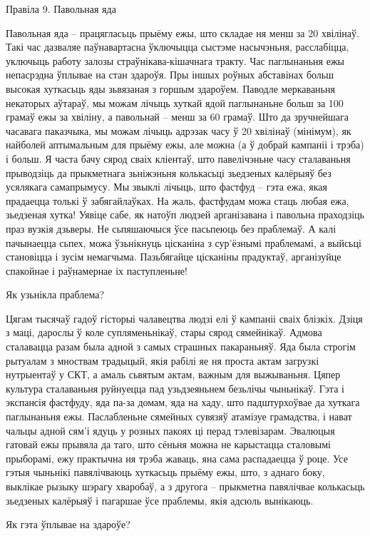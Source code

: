 Правіла 9. Павольная яда

Павольная яда – працягласьць прыёму ежы, што складае ня менш за 20 хвілінаў. Такі час дазваляе паўнавартасна ўключыцца сыстэме насычэньня, расслабіцца, уключыць работу залозы страўнікава-кішачнага тракту. Час паглынаньня ежы непасрэдна ўплывае на стан здароўя. Пры іншых роўных абставінах больш высокая хуткасьць яды зьвязаная з горшым здароўем. Паводле меркаваньня некаторых аўтараў, мы можам лічыць хуткай ядой паглынаньне больш за 100 грамаў ежы за хвіліну, а павольнай – менш за 60 грамаў. Што да зручнейшага часавага паказчыка, мы можам лічыць адрэзак часу ў 20 хвілінаў (мінімум), як найболей аптымальным для прыёму ежы, але можна (а ў добрай кампаніі і трэба) і больш.
Я часта бачу сярод сваіх кліентаў, што павелічэньне часу сталаваньня прыводзіць да прыкметнага зьніжэньня колькасьці зьедзеных калёрыяў без усялякага самапрымусу. Мы звыклі лічыць, што фастфуд – гэта ежа, якая прадаецца толькі ў забягайлаўках. На жаль, фастфудам можа стаць любая ежа, зьедзеная хутка! Уявіце сабе, як натоўп людзей арганізавана і павольна праходзіць праз вузкія дзьверы. Не сьпяшаючыся ўсе пасьпеюць без праблемаў. А калі пачынаецца сьпех, можа ўзьнікнуць цісканіна з сур'ёзнымі праблемамі, а выйсьці становіцца і зусім немагчыма. Пазьбягайце цісканіны прадуктаў, арганізуйце спакойнае і раўнамернае іх паступленьне!

Як узьнікла праблема?

Цягам тысячаў гадоў гісторыі чалавецтва людзі елі ў кампаніі сваіх блізкіх. Дзіця з маці, дарослы ў коле супляменьнікаў, стары сярод сямейнікаў. Адмова сталавацца разам была адной з самых страшных пакараньняў. Яда была строгім рытуалам з мноствам традыцый, якія рабілі яе ня проста актам загрузкі нутрыентаў у СКТ, а амаль сьвятым актам, важным для выжываньня.
Цяпер культура сталаваньня руйнуецца пад узьдзеяньнем безьлічы чыньнікаў. Гэта і экспансія фастфуду, яда па-за домам, яда на хаду, што падштурхоўвае да хуткага паглынаньня ежы. Паслабленьне сямейных сувязяў атамізуе грамадства, і нават чальцы адной сям'і ядуць у розных пакоях ці перад тэлевізарам. Эвалюцыя гатовай ежы прывяла да таго, што сёньня можна не карыстацца сталовымі прыборамі, ежу практычна ня трэба жаваць, яна сама распадаецца ў роце. Усе гэтыя чыньнікі павялічваюць хуткасьць прыёму ежы, што, з аднаго боку, выклікае рызыку шэрагу хваробаў, а з другога – прыкметна павялічвае колькасьць зьедзеных калёрыяў і пагаршае ўсе праблемы, якія адсюль вынікаюць.

Як гэта ўплывае на здароўе?

